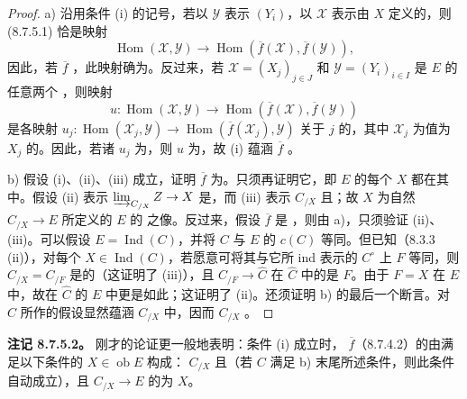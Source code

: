 \begin{proof}
 a) 沿用条件 (i) 的记号，若以 $\mathcal Y$ 表示  $(Y_i)$，以 $\mathcal X$ 表示由 $X$ 定义的，则 (8.7.5.1) 恰是映射
\[
\operatorname{Hom}(\mathcal X,\mathcal Y)\longrightarrow
\operatorname{Hom}(\overline f(\mathcal X),\overline f(\mathcal Y)),
\]
因此，若 $\overline f$ ，此映射确为。反过来，若 $\mathcal X=(X_j)_{j\in J}$ 和 $\mathcal Y=(Y_i)_{i\in I}$ 是 $E$ 的任意两个 ，则映射
\[
u:\operatorname{Hom}(\mathcal X,\mathcal Y)\longrightarrow
\operatorname{Hom}(\overline f(\mathcal X),\overline f(\mathcal Y))
\]
是各映射 $u_j:\operatorname{Hom}(\mathcal X_j,\mathcal Y)\to\operatorname{Hom}(\overline f(\mathcal X_j),\mathcal Y)$ 关于 $j$ 的，其中 $\mathcal X_j$ 为值为 $X_j$ 的。因此，若诸 $u_j$ 为，则 $u$ 为，故 (i) 蕴涵 $\overline f$ 。

 b) 假设 (i)、(ii)、(iii) 成立，证明 $\overline f$ 为。只须再证明它，即 $E$ 的每个 $X$ 都在其中。假设 (ii) 表示 $\varinjlim_{C_{/X}}Z\to X$ 是，而 (iii) 表示 $C_{/X}$ 且；故 $X$ 为自然 $C_{/X}\to E$ 所定义的 $E$ 的 之像。反过来，假设 $\overline f$ 是
，则由 a)，只须验证 (ii)、(iii)。可以假设 $E=\operatorname{Ind}(C)$，并将 $C$ 与 $E$ 的 $c(C)$ 等同。但已知（8.3.3 (ii)），对每个 $X\in\operatorname{Ind}(C)$，若愿意可将其与它所 ind 表示的 $C^\circ$ 上 $F$ 等同，则 $C_{/X}=C_{/F}$ 是的（这证明了 (iii)），且 $C_{/F}\to\widehat C$ 在 $\widehat C$ 中的是 $F$。由于 $F=X$ 在 $E$ 中，故在 $\widehat C$ 的 $E$ 中更是如此；这证明了 (ii)。还须证明 b) 的最后一个断言。对 $C$ 所作的假设显然蕴涵 $C_{/X}$ 中，因而 $C_{/X}$ 。
\end{proof}
\textbf{注记 8.7.5.2。} 刚才的论证更一般地表明：条件 (i) 成立时， $\overline f$（8.7.4.2）的由满足以下条件的 $X\in\operatorname{ob}E$ 构成： $C_{/X}$ 且（若 $C$ 满足 b) 末尾所述条件，则此条件自动成立），且 $C_{/X}\to E$ 的为 $X$。
